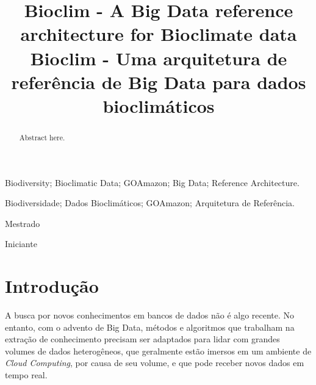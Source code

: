 \documentclass[conference]{IEEEtran}
\begin{document}
\title{Bioclim - A Big Data reference architecture for Bioclimate data\\
	Bioclim - Uma arquitetura de refer\^{e}ncia de Big Data para dados bioclim\'{a}ticos}

\author{
}


\maketitle

\thispagestyle{fancy}

\renewcommand{\abstractname}{Abstract}
\begin{abstract}
Abstract here.
\end{abstract}

\renewcommand\IEEEkeywordsname{Keywords}
\begin{IEEEkeywords}
\label{Keywords}
Biodiversity; Bioclimatic Data; GOAmazon; Big Data; Reference Architecture.
\end{IEEEkeywords}

\renewcommand{\abstractname}{Resumo}
\begin{abstract}
\label{Resumo}

\end{abstract}

\renewcommand\IEEEkeywordsname{Palavras-chave}
\begin{IEEEkeywords}
\label{Palavras-chave}
Biodiversidade; Dados Bioclim\'{a}ticos; GOAmazon; Arquitetura de Refer\^{e}ncia.
\end{IEEEkeywords}

\renewcommand\IEEEkeywordsname{Classifica\c{c}\~{a}o}
\begin{IEEEkeywords}
	\label{classificacao}
	Mestrado
\end{IEEEkeywords}

\renewcommand\IEEEkeywordsname{Categoria}
\begin{IEEEkeywords}
	\label{Categoria}
 	Iniciante
\end{IEEEkeywords}

\IEEEpeerreviewmaketitle

\section{Introdu\c{c}\~{a}o}
A busca por novos conhecimentos em bancos de dados n\~{a}o \'{e} algo recente\cite{Witten:2011}. No entanto, com o advento de Big Data, m\'{e}todos e algoritmos que trabalham na extra\c{c}\~{a}o de conhecimento precisam ser adaptados para lidar com grandes volumes de dados heterog\^{e}neos, que geralmente est\~{a}o imersos em um ambiente de \textit{Cloud Computing}, por causa de seu volume, e que pode receber novos dados em tempo real\cite{Crosas:2015}.
\end{document}
